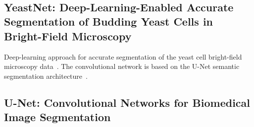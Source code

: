 ~\cite{kraus2016computer}

\subsection{YeastNet: Deep-Learning-Enabled Accurate Segmentation of Budding Yeast Cells in Bright-Field Microscopy}

Deep-learning approach for accurate segmentation of the yeast cell bright-field microscopy data~\cite{salem2021yeastnet}. The convolutional network is based on the U-Net semantic segmentation architecture~\cite{ronneberger2015u}.

\subsection{U-Net: Convolutional Networks for Biomedical Image Segmentation}

~\cite{ronneberger2015u}